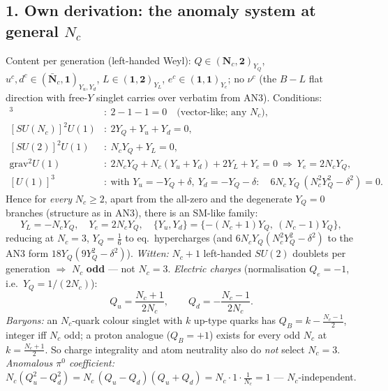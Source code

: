 \subsection*{1. Own derivation: the anomaly system at general
$N_c$}
Content per generation (left-handed Weyl):
$Q\in(\mathbf N_c,\mathbf 2)_{Y_Q}$,
$u^c,d^c\in(\bar{\mathbf N}_c,\mathbf 1)_{Y_{u},Y_d}$,
$L\in(\mathbf 1,\mathbf 2)_{Y_L}$,
$e^c\in(\mathbf 1,\mathbf 1)_{Y_e}$; no $\nu^c$ (the $B{-}L$ flat
direction with free-$Y$ singlet carries over verbatim from AN3).
Conditions:
\begin{align*}
[SU(N_c)]^3&:\ 2-1-1=0\quad\text{(vector-like; any }N_c\text{)},\\
[SU(N_c)]^2U(1)&:\ 2Y_Q+Y_u+Y_d=0,\\
[SU(2)]^2U(1)&:\ N_cY_Q+Y_L=0,\\
\mathrm{grav}^2U(1)&:\ 2N_cY_Q+N_c(Y_u{+}Y_d)+2Y_L+Y_e=0
 \ \Rightarrow\ Y_e=2N_cY_Q,\\
[U(1)]^3&:\ \text{with }Y_{u}=-Y_Q+\delta,\ Y_d=-Y_Q-\delta:\quad
 6N_c\,Y_Q\,(N_c^2Y_Q^2-\delta^2)=0 .
\end{align*}
Hence for \emph{every} $N_c\ge2$, apart from the all-zero and the
degenerate $Y_Q=0$ branches (structure as in AN3), there is an
SM-like family:
\[
Y_L=-N_cY_Q,\quad Y_e=2N_cY_Q,\quad
\{Y_u,Y_d\}=\{-(N_c{+}1)Y_Q,\ (N_c{-}1)Y_Q\},
\]
reducing at $N_c=3$, $Y_Q=\tfrac16$ to eq.~hypercharges
(and $6N_cY_Q(N_c^2Y_Q^2-\delta^2)$ to the AN3 form
$18Y_Q(9Y_Q^2-\delta^2)$).
\emph{Witten:} $N_c+1$ left-handed $SU(2)$ doublets per generation
$\Rightarrow$ $N_c$ \textbf{odd} --- not $N_c=3$.
\emph{Electric charges} (normalisation $Q_e=-1$, i.e.\
$Y_Q=1/(2N_c)$):
\[
Q_u=\frac{N_c+1}{2N_c},\qquad Q_d=-\frac{N_c-1}{2N_c}.
\]
\emph{Baryons:} an $N_c$-quark colour singlet with $k$ up-type
quarks has $Q_B=k-\tfrac{N_c-1}{2}$, integer iff $N_c$ odd; a
proton analogue ($Q_B={+}1$) exists for every odd $N_c$ at
$k=\tfrac{N_c+1}{2}$.
So charge integrality and atom neutrality also do \emph{not}
select $N_c=3$.
\emph{Anomalous $\pi^0$ coefficient:}
$N_c(Q_u^2-Q_d^2)=N_c\,(Q_u{-}Q_d)(Q_u{+}Q_d)
=N_c\cdot1\cdot\tfrac1{N_c}=1$ --- $N_c$-independent.

